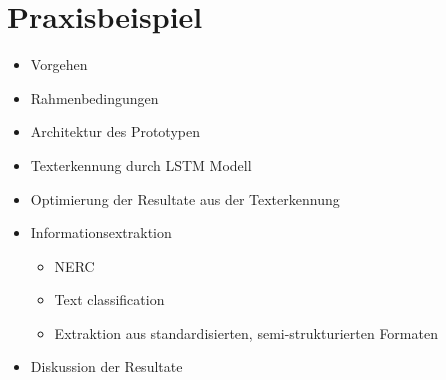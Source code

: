 \section{Praxisbeispiel}

\begin{itemize}
    \item Vorgehen
    \item Rahmenbedingungen
    \item Architektur des Prototypen
    \item Texterkennung durch LSTM Modell
    \item Optimierung der Resultate aus der Texterkennung
    \item Informationsextraktion
    \begin{itemize}
        \item NERC
        \item Text classification
        \item Extraktion aus standardisierten, semi-strukturierten Formaten
    \end{itemize}
    \item Diskussion der Resultate
\end{itemize}